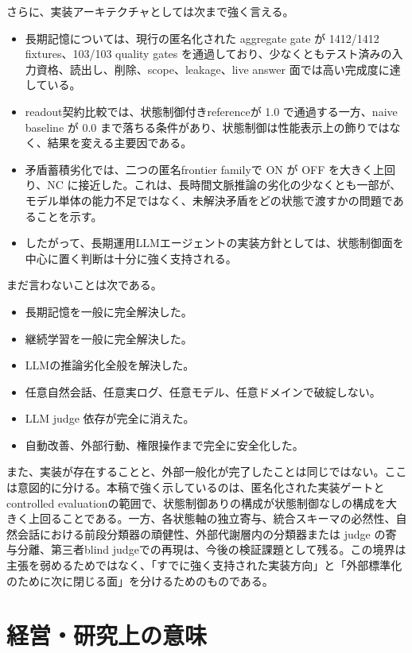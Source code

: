 \documentclass[12pt,a4paper]{article}
\begin{document}
さらに、実装アーキテクチャとしては次まで強く言える。

\begin{itemize}
\tightlist
\item
  長期記憶については、現行の匿名化された aggregate gate が 1412/1412 fixtures、103/103 quality gates を通過しており、少なくともテスト済みの入力資格、読出し、削除、scope、leakage、live answer 面では高い完成度に達している。
\item
  readout契約比較では、状態制御付きreferenceが 1.0 で通過する一方、naive baseline が 0.0 まで落ちる条件があり、状態制御は性能表示上の飾りではなく、結果を変える主要因である。
\item
  矛盾蓄積劣化では、二つの匿名frontier familyで ON が OFF を大きく上回り、NC に接近した。これは、長時間文脈推論の劣化の少なくとも一部が、モデル単体の能力不足ではなく、未解決矛盾をどの状態で渡すかの問題であることを示す。
\item
  したがって、長期運用LLMエージェントの実装方針としては、状態制御面を中心に置く判断は十分に強く支持される。
\end{itemize}

まだ言わないことは次である。

\begin{itemize}
\tightlist
\item
  長期記憶を一般に完全解決した。
\item
  継続学習を一般に完全解決した。
\item
  LLMの推論劣化全般を解決した。
\item
  任意自然会話、任意実ログ、任意モデル、任意ドメインで破綻しない。
\item
  LLM judge 依存が完全に消えた。
\item
  自動改善、外部行動、権限操作まで完全に安全化した。
\end{itemize}

また、実装が存在することと、外部一般化が完了したことは同じではない。ここは意図的に分ける。本稿で強く示しているのは、匿名化された実装ゲートとcontrolled evaluationの範囲で、状態制御ありの構成が状態制御なしの構成を大きく上回ることである。一方、各状態軸の独立寄与、統合スキーマの必然性、自然会話における前段分類器の頑健性、外部代謝層内の分類器または judge の寄与分離、第三者blind judgeでの再現は、今後の検証課題として残る。この境界は主張を弱めるためではなく、「すでに強く支持された実装方向」と「外部標準化のために次に閉じる面」を分けるためのものである。

\section{経営・研究上の意味}\label{ux7d4cux55b6ux7814ux7a76ux4e0aux306eux610fux5473}
\end{document}
